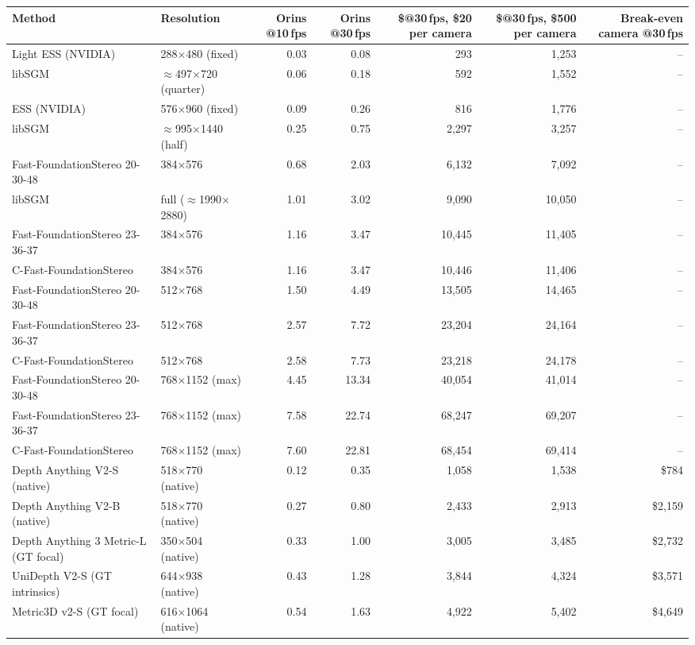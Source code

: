 \begin{tabular}{llrrrrr}
\toprule
Method & Resolution & Orins @10\,fps & Orins @30\,fps & \${}@30\,fps, \$20 per camera & \${}@30\,fps, \$500 per camera & Break-even camera @30\,fps \\
\midrule
Light ESS (NVIDIA) & 288$\times$480 (fixed) & 0.03 & 0.08 & 293 & 1,253 & -- \\
libSGM & $\approx$497$\times$720 (quarter) & 0.06 & 0.18 & 592 & 1,552 & -- \\
ESS (NVIDIA) & 576$\times$960 (fixed) & 0.09 & 0.26 & 816 & 1,776 & -- \\
libSGM & $\approx$995$\times$1440 (half) & 0.25 & 0.75 & 2,297 & 3,257 & -- \\
Fast-FoundationStereo 20-30-48 & 384$\times$576 & 0.68 & 2.03 & 6,132 & 7,092 & -- \\
libSGM & full ($\approx$1990$\times$2880) & 1.01 & 3.02 & 9,090 & 10,050 & -- \\
Fast-FoundationStereo 23-36-37 & 384$\times$576 & 1.16 & 3.47 & 10,445 & 11,405 & -- \\
C-Fast-FoundationStereo & 384$\times$576 & 1.16 & 3.47 & 10,446 & 11,406 & -- \\
Fast-FoundationStereo 20-30-48 & 512$\times$768 & 1.50 & 4.49 & 13,505 & 14,465 & -- \\
Fast-FoundationStereo 23-36-37 & 512$\times$768 & 2.57 & 7.72 & 23,204 & 24,164 & -- \\
C-Fast-FoundationStereo & 512$\times$768 & 2.58 & 7.73 & 23,218 & 24,178 & -- \\
Fast-FoundationStereo 20-30-48 & 768$\times$1152 (max) & 4.45 & 13.34 & 40,054 & 41,014 & -- \\
Fast-FoundationStereo 23-36-37 & 768$\times$1152 (max) & 7.58 & 22.74 & 68,247 & 69,207 & -- \\
C-Fast-FoundationStereo & 768$\times$1152 (max) & 7.60 & 22.81 & 68,454 & 69,414 & -- \\
Depth Anything V2-S (native) & 518$\times$770 (native) & 0.12 & 0.35 & 1,058 & 1,538 & \$784 \\
Depth Anything V2-B (native) & 518$\times$770 (native) & 0.27 & 0.80 & 2,433 & 2,913 & \$2,159 \\
Depth Anything 3 Metric-L (GT focal) & 350$\times$504 (native) & 0.33 & 1.00 & 3,005 & 3,485 & \$2,732 \\
UniDepth V2-S (GT intrinsics) & 644$\times$938 (native) & 0.43 & 1.28 & 3,844 & 4,324 & \$3,571 \\
Metric3D v2-S (GT focal) & 616$\times$1064 (native) & 0.54 & 1.63 & 4,922 & 5,402 & \$4,649 \\

\end{tabular}

